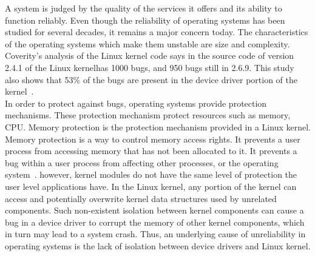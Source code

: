 A system is judged by the quality of the services it offers and its ability to function reliably. Even though the reliability of operating systems has been studied for several decades, it remains a major concern today. The characteristics of the operating systems which make them unstable are size and complexity. 
\\[3mm]
Coverity's analysis of the Linux kernel code says in the source code of version 2.4.1 of the Linux kernelhas 1000 bugs, and 950 bugs still in 2.6.9. This study also shows that 53\% of the bugs are present in the device driver portion of the kernel~\cite{coveritykernel}. 
\\[3mm]
In order to protect against bugs, operating systems provide protection mechanisms. These protection mechanism protect resources such as memory, CPU.
Memory protection is the protection mechanism provided in a Linux kernel. Memory protection is a way to control memory access rights. It prevents a user process from accessing memory that has not been allocated to it. It prevents a bug within a user process from affecting other processes, or the operating system~\cite{Denning:1970:VM:356571.356573, Galvin}. however,  kernel modules do not have the same level of protection the user level applications have. In the Linux kernel, any portion of the kernel can access and potentially overwrite kernel data structures used by unrelated components. Such non-existent isolation between kernel components can cause a bug in a device driver to corrupt the memory of other kernel components, which in turn may lead to a system crash. Thus, an underlying cause of unreliability in operating systems is the lack of isolation between device drivers and Linux kernel.

